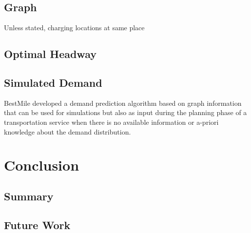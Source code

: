 \documentclass[12pt,a4paper]{article}
\begin{document}
\subsection{Graph}
Unless stated, charging locations at same place
\subsection{Optimal Headway}
\subsection{Simulated Demand}
BestMile developed a demand prediction algorithm based on graph information that can be used for simulations but also as input during the planning phase of a transportation service when there is no available information or a-priori knowledge about the demand distribution. 
\section{Conclusion}\label{conclusion}
\subsection{Summary}\label{summary}
\subsection{Future Work}\label{futurework}



\end{document}
